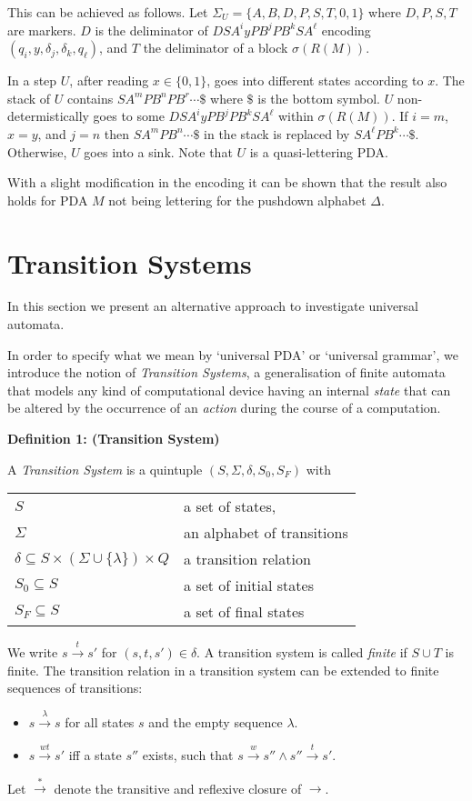 \documentclass{eptcs}
\def\raa{\longrightarrow}
\def\ss{\subseteq}
\def\raa{\longrightarrow}
\newcommand{\ew}{\lambda}
\begin{document}
This can be achieved as follows. Let $\Sigma_U=\{A,B,D,P,S,T,0,1\}$ where
$D,P,S,T$ are markers. $D$ is the deliminator of
$DSA^iyPB^jPB^kSA^{\ell}$ encoding $(q_i,y,\delta_j,\delta_k,q_{\ell})$,
and $T$ the deliminator of a block $\sigma(R(M))$.

In a step $U$, after reading $x\in\{0,1\}$, goes into different states according to $x$.
The stack of $U$ contains $SA^mPB^nPB^r\cdots \$$ where $\$$ is the bottom symbol.
$U$ non-determistically goes to some $DSA^iyPB^jPB^kSA^{\ell}$ within $\sigma(R(M))$.
If $i=m$, $x=y$, and $j=n$ then $SA^mPB^n\cdots \$$ in the stack is
replaced by $SA^{\ell}PB^k\cdots \$$. Otherwise, $U$ goes into a sink.
Note that $U$ is a quasi-lettering PDA.

With a slight modification in the encoding it can be shown that the result also holds
for PDA $M$ not being lettering for the pushdown alphabet
$\Delta$.

\section{Transition Systems}

In this section we present an alternative approach to investigate universal
automata.	
	
	In order to specify what we mean by `universal PDA' or 
	`universal grammar', we introduce the notion of \emph{Transition Systems}, a generalisation of finite automata
	that models any kind of computational device having
	an internal \emph{state} that can be altered by the occurrence of 
	an \emph{action} during the course of a computation.

\bigskip
\noindent
	{\bf Definition 1: (Transition System)} \label{def:TS}
	
		A \emph{Transition System} is a quintuple $(S,\Sigma,\delta,S_0,S_F)$ with
		
		\begin{tabular}{ll}
			$S$  							& a set of states,\\
			$\Sigma$						& an alphabet of transitions\\
			$\delta \subseteq S\times (\Sigma\cup\{\ew\}) \times Q$
											& a transition relation\\
			$S_0\ss S$			& a set of initial states\\
			$S_F\ss S$			& a set of final states\\
		\end{tabular}
		
		We write $s\stackrel{t}{\raa}s'$ for $(s,t,s')\in \delta$.
		A transition system is called \emph{finite} if $S\cup T$ is finite.
The transition relation in a transition system can be extended 
		to finite sequences of transitions:
		\begin{itemize}
		 		 \item $s \stackrel{\ew}{\raa} s$ for all states $s$
		 					and the empty sequence $\ew$.
		 		 \item $s \stackrel{wt}{\raa} s'$ iff a state $s''$ exists,
		 					such that $s \stackrel{w}{\raa} s'' \land 
		 					s'' \stackrel{t}{\raa} s'$.
		\end{itemize}
		Let $\stackrel{*}{\raa}$ denote the transitive and reflexive closure
		of $\raa$.
\end{document}
